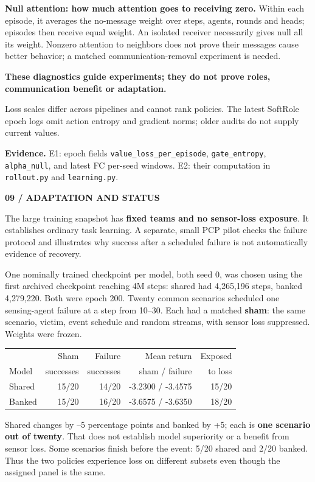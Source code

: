 \documentclass[11pt,letterpaper]{article}
\newcommand{\eyebrow}[1]{{\small\bfseries\color{teal}#1}\par\vspace{3pt}}
\newcommand{\pagetitle}[2]{\eyebrow{#1}{\fontsize{25}{28}\selectfont\bfseries #2\par}\vspace{7pt}}
\newcommand{\sub}[1]{\par\vspace{5pt}{\large\bfseries #1}\par\vspace{1pt}}
\newcommand{\takeaway}[1]{\par\vspace{5pt}\noindent\colorbox{pale}{\parbox{\dimexpr\linewidth-18pt\relax}{\vspace{5pt}\textbf{#1}\vspace{5pt}}}\par\vspace{3pt}}
\newcommand{\evidence}[1]{\vfill{\fontsize{8.4}{10.5}\selectfont\color{muted}\textbf{Evidence.} #1\par}}
\newcommand{\captiontext}[1]{\par{\fontsize{9}{11}\selectfont\color{muted}#1\par}}
\newcommand{\code}[1]{\nolinkurl{#1}}
\begin{document}
\textbf{Null attention: how much attention goes to receiving zero.} Within each episode, it averages the no-message weight over steps, agents, rounds and heads; episodes then receive equal weight. An isolated receiver necessarily gives null all its weight. Nonzero attention to neighbors does not prove their messages cause better behavior; a matched communication-removal experiment is needed.

\takeaway{These diagnostics guide experiments; they do not prove roles, communication benefit or adaptation.}
\captiontext{Loss scales differ across pipelines and cannot rank policies. The latest SoftRole epoch logs omit action entropy and gradient norms; older audits do not supply current values.}
\evidence{E1: epoch fields \code{value_loss_per_episode}, \code{gate_entropy}, \code{alpha_null}, and latest FC per-seed windows. E2: their computation in \code{rollout.py} and \code{learning.py}.}
\endgroup

\newpage
\pagetitle{09 / ADAPTATION AND STATUS}{The main research question is still open}
The large training snapshot has \textbf{fixed teams and no sensor-loss exposure}. It establishes ordinary task learning. A separate, small PCP pilot checks the failure protocol and illustrates why success after a scheduled failure is not automatically evidence of recovery.

\sub{What the sensor-loss pilot actually did}
One nominally trained checkpoint per model, both seed 0, was chosen using the first archived checkpoint reaching 4M steps: shared had 4,265,196 steps, banked 4,279,220. Both were epoch 200. Twenty common scenarios scheduled one sensing-agent failure at a step from 10--30. Each had a matched \textbf{sham}: the same scenario, victim, event schedule and random streams, with sensor loss suppressed. Weights were frozen.

{\small\renewcommand{\arraystretch}{1.25}\begin{tabularx}{\linewidth}{@{}Xrrrr@{}}\toprule
 & Sham & Failure & Mean return & Exposed \\
Model & successes & successes & sham / failure & to loss \\\midrule
Shared & 15/20 & 14/20 & -3.2300 / -3.4575 & 15/20 \\
Banked & 15/20 & 16/20 & -3.6575 / -3.6350 & 18/20 \\
\bottomrule
\end{tabularx}}

Shared changes by --5 percentage points and banked by +5; each is \textbf{one scenario out of twenty}. That does not establish model superiority or a benefit from sensor loss. Some scenarios finish before the event: 5/20 shared and 2/20 banked. Thus the two policies experience loss on different subsets even though the assigned panel is the same.
\end{document}
